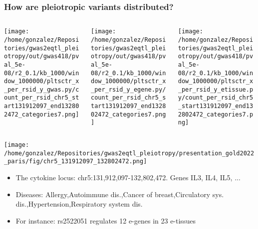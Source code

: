 \documentclass{beamer}
\begin{document}
\begin{frame}
\frametitle{How are pleiotropic variants distributed?}

\begin{columns}
\begin{column}{0.32\textwidth}
    \begin{center}
\texttt{[image: /home/gonzalez/Repositories/gwas2eqtl\_pleiotropy/out/gwas418/pval\_5e-08/r2\_0.1/kb\_1000/window\_1000000/pltsctr\_x\_per\_rsid\_y\_gwas.py/count\_per\_rsid\_chr5\_start131912097\_end132802472\_categories7.png]}
     \end{center}
\end{column}
\begin{column}{0.32\textwidth}
    \begin{center}
\texttt{[image: /home/gonzalez/Repositories/gwas2eqtl\_pleiotropy/out/gwas418/pval\_5e-08/r2\_0.1/kb\_1000/window\_1000000/pltsctr\_x\_per\_rsid\_y\_egene.py/count\_per\_rsid\_chr5\_start131912097\_end132802472\_categories7.png]}
     \end{center}
\end{column}
\begin{column}{0.32\textwidth}
    \begin{center}
\texttt{[image: /home/gonzalez/Repositories/gwas2eqtl\_pleiotropy/out/gwas418/pval\_5e-08/r2\_0.1/kb\_1000/window\_1000000/pltsctr\_x\_per\_rsid\_y\_etissue.py/count\_per\_rsid\_chr5\_start131912097\_end132802472\_categories7.png]}
     \end{center}
\end{column}
\end{columns}

\begin{center}
\texttt{[image: /home/gonzalez/Repositories/gwas2eqtl\_pleiotropy/presentation\_gold2022\_paris/fig/chr5\_131912097\_132802472.png]}
\end{center}

\small
\begin{itemize}
\item The cytokine locus: chr5:131,912,097-132,802,472. Genes IL3, IL4, IL5, ...
\item Diseases: Allergy,Autoimmune dis.,Cancer of breast,Circulatory sys. dis.,Hypertension,Respiratory system dis.
\item For instance: rs2522051 regulates 12 e-genes in 23 e-tissues
\end{itemize}
\normalsize

\end{frame}
\end{document}
